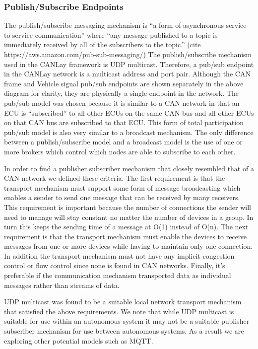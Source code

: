 \documentclass[letterpaper,twocolumn,12pt]{article}
\begin{document}
\subsubsection{Publish/Subscribe Endpoints}
The publish/subscribe messaging mechanism is “a form of asynchronous service-to-service communication” where “any message published to a topic is immediately received by all of the subscribers to the topic.” (cite https://aws.amazon.com/pub-sub-messaging/) The publish/subscribe mechanism used in the CANLay framework is UDP multicast. Therefore, a pub/sub endpoint in the CANLay network is a multicast address and port pair. Although the CAN frame and Vehicle signal pub/sub endpoints are shown separately in the above diagram for clarity, they are physically a single endpoint in the network. The pub/sub model was chosen because it is similar to a CAN network in that an ECU is “subscribed” to all other ECUs on the same CAN bus and all other ECUs on that CAN bus are subscribed to that ECU. This form of total participation pub/sub model is also very similar to a broadcast mechanism. The only difference between a publish/subscribe model and a broadcast model is the use of one or more brokers which control which nodes are able to subscribe to each other. 

In order to find a publisher subscriber mechanism that closely resembled that of a CAN network we defined these criteria. The first requirement is that the transport mechanism must support some form of message broadcasting which enables a sender to send one message that can be received by many receivers. This requirement is important because the number of connections the sender will need to manage will stay constant no matter the number of devices in a group. In turn this keeps the sending time of a message at O(1) instead of O(n). The next requirement is that the transport mechanism must enable the devices to receive messages from one or more devices while having to maintain only one connection. In addition the transport mechanism must not have any implicit congestion control or flow control since none is found in CAN networks. Finally, it's preferable if the communication mechanism transported data as individual messages rather than streams of data.

UDP multicast was found to be a suitable local network transport mechanism that satisfied the above requirements. We note that while UDP multicast is suitable for use within an autonomous system it may not be a suitable publisher subscriber mechanism for use between autonomous systems. As a result we are exploring other potential models such as MQTT.
\end{document}
